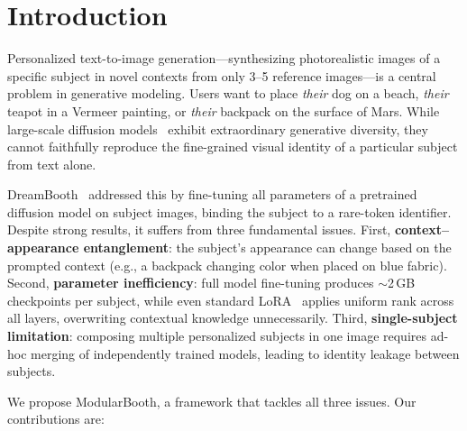 \documentclass{article}
\begin{document}
\section{Introduction}
\label{sec:intro}

Personalized text-to-image generation---synthesizing photorealistic images of a specific subject in novel contexts from only 3--5 reference images---is a central problem in generative modeling.
Users want to place \emph{their} dog on a beach, \emph{their} teapot in a Vermeer painting, or \emph{their} backpack on the surface of Mars.
While large-scale diffusion models~\citep{rombach2022high, saharia2022photorealistic} exhibit extraordinary generative diversity, they cannot faithfully reproduce the fine-grained visual identity of a particular subject from text alone.

DreamBooth~\citep{ruiz2023dreambooth} addressed this by fine-tuning all parameters of a pretrained diffusion model on subject images, binding the subject to a rare-token identifier.
Despite strong results, it suffers from three fundamental issues.
First, \textbf{context--appearance entanglement}: the subject's appearance can change based on the prompted context (e.g., a backpack changing color when placed on blue fabric).
Second, \textbf{parameter inefficiency}: full model fine-tuning produces $\sim$2\,GB checkpoints per subject, while even standard LoRA~\citep{hu2022lora} applies uniform rank across all layers, overwriting contextual knowledge unnecessarily.
Third, \textbf{single-subject limitation}: composing multiple personalized subjects in one image requires ad-hoc merging of independently trained models, leading to identity leakage between subjects.

We propose ModularBooth, a framework that tackles all three issues.
Our contributions are:
\end{document}
